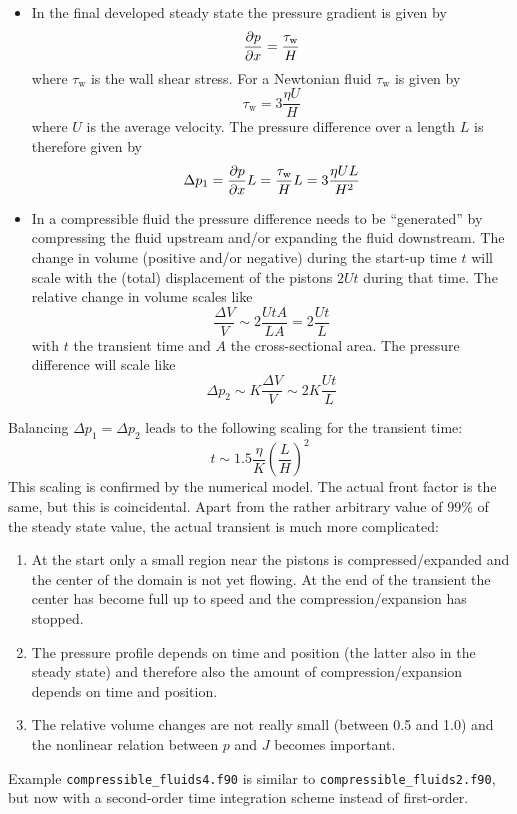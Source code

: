 \begin{itemize}
   \item In the final developed steady state the pressure gradient is given by
\[
    \dfrac{\partial p}{\partial x}=\frac{\tau_\text{w}}{H}
\]
where $\tau_\text{w}$ is the wall shear stress. For a Newtonian fluid
$\tau_\text{w}$ is given by
\[
    \tau_\text{w}=3\frac{\eta U}{H}
\]
where $U$ is the average velocity. The pressure difference over a length $L$ is
therefore given by
\[
    \Delta p_1= \dfrac{\partial p}{\partial x}L=\frac{\tau_\text{w}}{H}L=3\frac{\eta U L}{H^2}
\]
    \item In a compressible fluid the pressure difference needs to be
 ``generated'' by compressing the fluid upstream and/or expanding the fluid
downstream. 
The change in volume (positive and/or negative) during the start-up
time $t$ will scale
with the (total) displacement of the
pistons $2Ut$ during that time. The relative change in volume scales like
\[
  \frac{\Delta V}{V}\sim 2\frac{UtA}{LA}=2\frac{Ut}{L}
\]
with $t$ the transient time and $A$ the cross-sectional area.
The pressure difference will scale like
\[
   \Delta p_2 \sim K \frac{\Delta V}{V}\sim 2K\frac{Ut}{L}
\]
\end{itemize}
Balancing 
$\Delta p_1=\Delta p_2$ leads to the following scaling for the transient
time:
\[
   t\sim1.5\frac{\eta}{K}(\frac{L}{H})^2
\]
This scaling is confirmed by the numerical model.
The actual front factor is the same, but this is coincidental. Apart from the
rather arbitrary value of 99\% of the steady state value,
the actual transient is much more complicated:
\begin{enumerate}
   \item At the start only a small region near the pistons is
compressed/expanded and the center of the domain is not yet flowing. At the end
of the transient the center has become full up to speed and the
compression/expansion has stopped.
   \item The pressure profile depends on time and position (the latter 
         also in the steady state) and therefore also the
         amount of compression/expansion depends on time and position.
   \item The relative
         volume changes are not really small (between 0.5 and 1.0) and
         the nonlinear relation between
         $p$ and $J$ becomes important.
\end{enumerate}

Example
\texttt{compressible\_fluids4.f90} is similar to 
\texttt{compressible\_fluids2.f90}, but now with a
second-order time integration scheme instead of first-order. 

